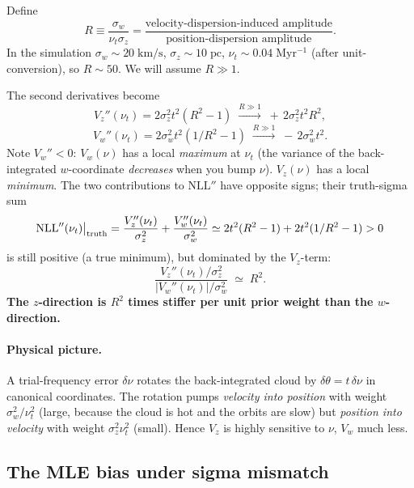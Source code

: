 \documentclass[11pt]{article}
\begin{document}
Define
\begin{equation}
\boxed{\;
R \equiv \frac{\sigma_w}{\nu_t\sigma_z}
= \frac{\text{velocity-dispersion-induced amplitude}}{\text{position-dispersion amplitude}}.
\;}
\end{equation}
In the simulation $\sigma_w\sim 20\;\mathrm{km/s}$, $\sigma_z\sim 10\;\mathrm{pc}$,
$\nu_t\sim 0.04\;\mathrm{Myr^{-1}}$ (after unit-conversion), so $R\sim 50$.
We will assume $R\gg 1$.

The second derivatives become
\begin{equation}
V_z''(\nu_t) = 2\sigma_z^2 t^2(R^2-1) \;\xrightarrow{R\gg 1}\; +\,2\sigma_z^2 t^2 R^2,
\end{equation}
\begin{equation}
V_w''(\nu_t) = 2\sigma_w^2 t^2(1/R^2 - 1) \;\xrightarrow{R\gg 1}\; -\,2\sigma_w^2 t^2.
\end{equation}
Note $V_w''<0$: $V_w(\nu)$ has a local \emph{maximum} at $\nu_t$ (the variance of the
back-integrated $w$-coordinate \emph{decreases} when you bump $\nu$). $V_z(\nu)$ has a
local \emph{minimum}. The two contributions to $\mathrm{NLL}''$ have opposite signs;
their truth-sigma sum
\begin{equation}
\mathrm{NLL}''(\nu_t)\big|_{\rm truth}
= \frac{V_z''(\nu_t)}{\sigma_z^2} + \frac{V_w''(\nu_t)}{\sigma_w^2}
\simeq 2t^2(R^2-1) + 2t^2(1/R^2-1) > 0
\end{equation}
is still positive (a true minimum), but dominated by the $V_z$-term:
\begin{equation}
\boxed{\;
\frac{V_z''(\nu_t)/\sigma_z^2}{|V_w''(\nu_t)|/\sigma_w^2}\;\simeq\; R^2.
\;}
\label{eq:Rsquared}
\end{equation}
\textbf{The $z$-direction is $R^2$ times stiffer per unit prior weight than the
$w$-direction.}

\paragraph{Physical picture.}
A trial-frequency error $\delta\nu$ rotates the back-integrated cloud by
$\delta\theta = t\,\delta\nu$ in canonical coordinates. The rotation pumps
\emph{velocity into position} with weight $\sigma_w^2/\nu_t^2$ (large, because the cloud
is hot and the orbits are slow) but \emph{position into velocity} with weight
$\sigma_z^2\nu_t^2$ (small). Hence $V_z$ is highly sensitive to $\nu$, $V_w$ much less.

\subsection{The MLE bias under sigma mismatch}
\end{document}
